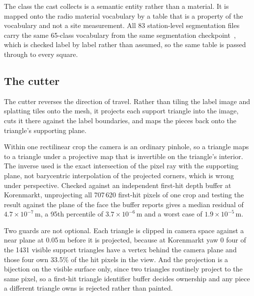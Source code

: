 \documentclass[journal]{IEEEtran}
\begin{document}
The class the cast collects is a semantic entity rather than a material. It is
mapped onto the radio material vocabulary by a table that is a property of the
vocabulary and not a site measurement. All 83 station-level segmentation files
carry the same 65-class vocabulary from the same segmentation
checkpoint~\cite{mask2former,vistas}, which is checked label by label rather
than assumed, so the same table is passed through to every square.

\subsection{The cutter}

The cutter reverses the direction of travel. Rather than tiling the label image
and splatting tiles onto the mesh, it projects each support triangle into the
image, cuts it there against the label boundaries, and maps the pieces back onto
the triangle's supporting plane.

Within one rectilinear crop the camera is an ordinary pinhole, so a triangle
maps to a triangle under a projective map that is invertible on the triangle's
interior. The inverse used is the exact intersection of the pixel ray with the
supporting plane, not barycentric interpolation of the projected corners, which
is wrong under perspective. Checked against an independent first-hit depth
buffer at Korenmarkt, unprojecting all 707\,620 first-hit pixels of one crop and
testing the result against the plane of the face the buffer reports gives a
median residual of $4.7 \times 10^{-7}$\,m, a 95th percentile of
$3.7 \times 10^{-6}$\,m and a worst case of $1.9 \times 10^{-5}$\,m.

Two guards are not optional. Each triangle is clipped in camera space against a
near plane at 0.05\,m before it is projected, because at Korenmarkt yaw 0 four of
the 1431 visible support triangles have a vertex behind the camera plane and
those four own 33.5\% of the hit pixels in the view. And the projection is a
bijection on the visible surface only, since two triangles routinely project to
the same pixel, so a first-hit triangle identifier buffer decides ownership and
any piece a different triangle owns is rejected rather than painted.
\end{document}
